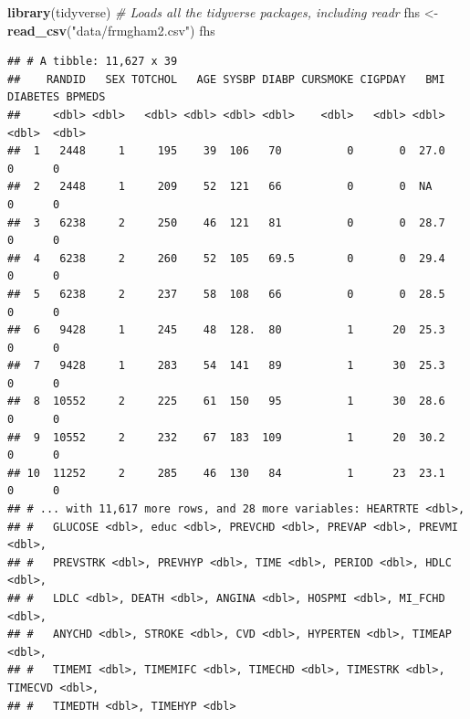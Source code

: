 \documentclass[
]{book}
\newenvironment{Shaded}{\begin{snugshade}}{\end{snugshade}}
\newcommand{\CommentTok}[1]{\textcolor[rgb]{0.56,0.35,0.01}{\textit{#1}}}
\newcommand{\KeywordTok}[1]{\textcolor[rgb]{0.13,0.29,0.53}{\textbf{#1}}}
\newcommand{\NormalTok}[1]{#1}
\newcommand{\StringTok}[1]{\textcolor[rgb]{0.31,0.60,0.02}{#1}}
\begin{document}
\begin{Shaded}
\begin{Highlighting}[]
\KeywordTok{library}\NormalTok{(tidyverse) }\CommentTok{# Loads all the tidyverse packages, including readr}
\NormalTok{fhs <-}\StringTok{ }\KeywordTok{read_csv}\NormalTok{(}\StringTok{"data/frmgham2.csv"}\NormalTok{)}
\NormalTok{fhs}
\end{Highlighting}
\end{Shaded}

\begin{verbatim}
## # A tibble: 11,627 x 39
##    RANDID   SEX TOTCHOL   AGE SYSBP DIABP CURSMOKE CIGPDAY   BMI DIABETES BPMEDS
##     <dbl> <dbl>   <dbl> <dbl> <dbl> <dbl>    <dbl>   <dbl> <dbl>    <dbl>  <dbl>
##  1   2448     1     195    39  106   70          0       0  27.0        0      0
##  2   2448     1     209    52  121   66          0       0  NA          0      0
##  3   6238     2     250    46  121   81          0       0  28.7        0      0
##  4   6238     2     260    52  105   69.5        0       0  29.4        0      0
##  5   6238     2     237    58  108   66          0       0  28.5        0      0
##  6   9428     1     245    48  128.  80          1      20  25.3        0      0
##  7   9428     1     283    54  141   89          1      30  25.3        0      0
##  8  10552     2     225    61  150   95          1      30  28.6        0      0
##  9  10552     2     232    67  183  109          1      20  30.2        0      0
## 10  11252     2     285    46  130   84          1      23  23.1        0      0
## # ... with 11,617 more rows, and 28 more variables: HEARTRTE <dbl>,
## #   GLUCOSE <dbl>, educ <dbl>, PREVCHD <dbl>, PREVAP <dbl>, PREVMI <dbl>,
## #   PREVSTRK <dbl>, PREVHYP <dbl>, TIME <dbl>, PERIOD <dbl>, HDLC <dbl>,
## #   LDLC <dbl>, DEATH <dbl>, ANGINA <dbl>, HOSPMI <dbl>, MI_FCHD <dbl>,
## #   ANYCHD <dbl>, STROKE <dbl>, CVD <dbl>, HYPERTEN <dbl>, TIMEAP <dbl>,
## #   TIMEMI <dbl>, TIMEMIFC <dbl>, TIMECHD <dbl>, TIMESTRK <dbl>, TIMECVD <dbl>,
## #   TIMEDTH <dbl>, TIMEHYP <dbl>
\end{verbatim}
\end{document}
